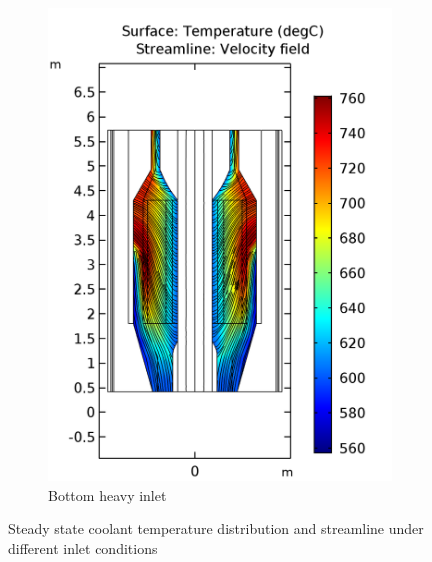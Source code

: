 \documentclass{elsarticle}
\begin{document}
\begin{figure}
    \begin{subfigure}[b]{0.45\textwidth}
        \centering
        \includegraphics[width=\textwidth]{images/diffusion/mk1/SS/flow_opti/T_flibe_bottom.png}
        \caption{Bottom heavy inlet}
    \end{subfigure}

    \caption{Steady state coolant temperature distribution and streamline under different inlet conditions}
    \label{fig:mk1_temp_flibe}
\end{figure}
\end{document}
